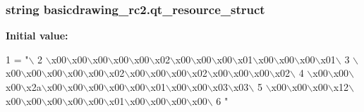 \subsubsection[{qt\+\_\+resource\+\_\+struct}]{\setlength{\rightskip}{0pt plus 5cm}string basicdrawing\+\_\+rc2.\+qt\+\_\+resource\+\_\+struct}\label{namespacebasicdrawing__rc2_aa80e512d96340c796e6fe2b65727ae11}
{\bfseries Initial value\+:}
\begin{DoxyCode}
1 = \textcolor{stringliteral}{"\(\backslash\)}
2 \textcolor{stringliteral}{\(\backslash\)x00\(\backslash\)x00\(\backslash\)x00\(\backslash\)x00\(\backslash\)x00\(\backslash\)x02\(\backslash\)x00\(\backslash\)x00\(\backslash\)x00\(\backslash\)x01\(\backslash\)x00\(\backslash\)x00\(\backslash\)x00\(\backslash\)x01\(\backslash\)}
3 \textcolor{stringliteral}{\(\backslash\)x00\(\backslash\)x00\(\backslash\)x00\(\backslash\)x00\(\backslash\)x00\(\backslash\)x02\(\backslash\)x00\(\backslash\)x00\(\backslash\)x00\(\backslash\)x02\(\backslash\)x00\(\backslash\)x00\(\backslash\)x00\(\backslash\)x02\(\backslash\)}
4 \textcolor{stringliteral}{\(\backslash\)x00\(\backslash\)x00\(\backslash\)x00\(\backslash\)x2a\(\backslash\)x00\(\backslash\)x00\(\backslash\)x00\(\backslash\)x00\(\backslash\)x00\(\backslash\)x01\(\backslash\)x00\(\backslash\)x00\(\backslash\)x03\(\backslash\)x03\(\backslash\)}
5 \textcolor{stringliteral}{\(\backslash\)x00\(\backslash\)x00\(\backslash\)x00\(\backslash\)x12\(\backslash\)x00\(\backslash\)x00\(\backslash\)x00\(\backslash\)x00\(\backslash\)x00\(\backslash\)x01\(\backslash\)x00\(\backslash\)x00\(\backslash\)x00\(\backslash\)x00\(\backslash\)}
6 \textcolor{stringliteral}{"}
\end{DoxyCode}
